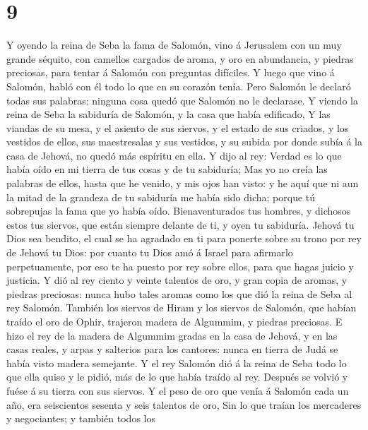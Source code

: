 \hypertarget{section-8}{%
\section{9}\label{section-8}}

 Y oyendo la reina de Seba la fama de Salomón, vino á
Jerusalem con un muy grande séquito, con camellos cargados de aroma, y
oro en abundancia, y piedras preciosas, para tentar á Salomón con
preguntas difíciles. Y luego que vino á Salomón, habló con él todo lo
que en su corazón tenía.  Pero Salomón le declaró todas
sus palabras: ninguna cosa quedó que Salomón no le declarase.
 Y viendo la reina de Seba la sabiduría de Salomón, y la
casa que había edificado,  Y las viandas de su mesa, y el
asiento de sus siervos, y el estado de sus criados, y los vestidos de
ellos, sus maestresalas y sus vestidos, y su subida por donde subía á la
casa de Jehová, no quedó más espíritu en ella.  Y dijo al
rey: Verdad es lo que había oído en mi tierra de tus cosas y de tu
sabiduría;  Mas yo no creía las palabras de ellos, hasta
que he venido, y mis ojos han visto: y he aquí que ni aun la mitad de la
grandeza de tu sabiduría me había sido dicha; porque tú sobrepujas la
fama que yo había oído.  Bienaventurados tus hombres, y
dichosos estos tus siervos, que están siempre delante de ti, y oyen tu
sabiduría.  Jehová tu Dios sea bendito, el cual se ha
agradado en ti para ponerte sobre su trono por rey de Jehová tu Dios:
por cuanto tu Dios amó á Israel para afirmarlo perpetuamente, por eso te
ha puesto por rey sobre ellos, para que hagas juicio y justicia.
 Y dió al rey ciento y veinte talentos de oro, y gran
copia de aromas, y piedras preciosas: nunca hubo tales aromas como los
que dió la reina de Seba al rey Salomón.  También los
siervos de Hiram y los siervos de Salomón, que habían traído el oro de
Ophir, trajeron madera de Algummim, y piedras preciosas. 
E hizo el rey de la madera de Algummim gradas en la casa de Jehová, y en
las casas reales, y arpas y salterios para los cantores: nunca en tierra
de Judá se había visto madera semejante.  Y el rey
Salomón dió á la reina de Seba todo lo que ella quiso y le pidió, más de
lo que había traído al rey. Después se volvió y fuése á su tierra con
sus siervos.  Y el peso de oro que venía á Salomón cada
un año, era seiscientos sesenta y seis talentos de oro, 
Sin lo que traían los mercaderes y negociantes; y también todos los
